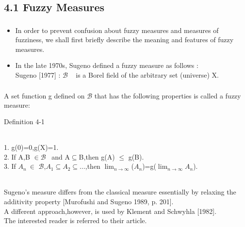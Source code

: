 \documentclass{beamer}
\begin{document}
\begin{CJK*}{UTF8}{bsmi}
\subsection{4.1 Fuzzy Measures}%


\begin{frame}
\frametitle{}

\begin{itemize}
\item In order to prevent confusion about fuzzy measures and measures of fuzziness, we shall first briefly describe the meaning and features of fuzzy measures. 
\item In the late 1970s, Sugeno defined a fuzzy measure as follows :\\
Sugeno [1977] :  \Large $\mathscr{B}$ ~ \normalsize is a Borel field of the arbitrary set (universe) X.

\end{itemize}

\end{frame}


\begin{frame}
\frametitle{}
A set function g defined on \Large $\mathscr{B}$ \normalsize that has the following properties is called a fuzzy measure:\\
\begin{block}{Definition 4-1}

~\\
1. g(0)=0,g(X)=1.\\
2. If A,B $\in$\Large $\mathscr{B}$\normalsize~ and A$ \subseteq $B,then g(A) $\leq$ g(B).\\
3. If $A_{n}~\in$ \Large $\mathscr{B}$\normalsize,$A_{1} \subseteq A_{2} \subseteq$...,then $ \lim_{n \rightarrow  \infty } $($A_{n}$)=g($ \lim_{n \rightarrow  \infty } A_{n}$).\\
~\\
\end{block}
Sugeno's measure differs from the classical measure essentially by relaxing the additivity property [Murofushi and Sugeno 1989, p. 201].\\
A different approach,however, is used by Klement and Schwyhla [1982].\\
The interested reader is referred to their article.
\end{frame}


\end{CJK*}
\end{document}
